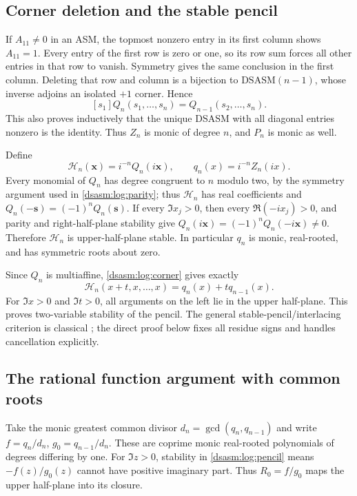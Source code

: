 \documentclass[11pt,letterpaper]{article}
\theoremstyle{remark}\newtheorem{remark}[theorem]{Remark}
\newcommand{\DS}{\mathrm{DSASM}}\newcommand{\ASM}{\mathrm{ASM}}
\begin{document}
\subsection{Corner deletion and the stable pencil}
If $A_{11}\ne0$ in an ASM, the topmost nonzero entry in its first
column shows $A_{11}=1$. Every entry of the first row is zero or one,
so its row sum forces all other entries in that row to vanish.
Symmetry gives the same conclusion in the first column. Deleting
that row and column is a bijection to $\DS(n-1)$, whose inverse
adjoins an isolated $+1$ corner. Hence
\begin{equation}\label{dsasm:log:corner}
 [s_1]Q_n(s_1,\ldots,s_n)=Q_{n-1}(s_2,\ldots,s_n).
\end{equation}
This also proves inductively that the unique DSASM with all diagonal
entries nonzero is the identity. Thus $Z_n$ is monic of degree $n$,
and $P_n$ is monic as well.

Define
\[
 \mathcal H_n(\mathbf x)=i^{-n}Q_n(i\mathbf x),\qquad
 q_n(x)=i^{-n}Z_n(ix).
\]
Every monomial of $Q_n$ has degree congruent to $n$ modulo two, by
the symmetry argument used in \eqref{dsasm:log:parity}; thus $\mathcal H_n$
has real coefficients and $Q_n(-\mathbf s)=(-1)^nQ_n(\mathbf s)$.
If every $\Im x_j>0$, then every $\Re(-ix_j)>0$, and parity and
right-half-plane stability give
$Q_n(i\mathbf x)=(-1)^nQ_n(-i\mathbf x)\ne0$.
Therefore $\mathcal H_n$ is upper-half-plane stable. In particular
$q_n$ is monic, real-rooted, and has symmetric roots about zero.

Since $Q_n$ is multiaffine, \eqref{dsasm:log:corner} gives exactly
\begin{equation}\label{dsasm:log:pencil}
 \mathcal H_n(x+t,x,\ldots,x)=q_n(x)+tq_{n-1}(x).
\end{equation}
For $\Im x>0$ and $\Im t>0$, all arguments on the left lie in the
upper half-plane. This proves two-variable stability of the pencil.
The general stable-pencil/interlacing criterion is classical
\cite[Definition 1.1 and Lemma 1.8]{bb1}; the direct proof below fixes
all residue signs and handles cancellation explicitly.

\subsection{The rational function argument with common roots}
Take the monic greatest common divisor $d_n=\gcd(q_n,q_{n-1})$ and
write $f=q_n/d_n$, $g_0=q_{n-1}/d_n$. These are coprime monic
real-rooted polynomials of degrees differing by one. For $\Im z>0$,
stability in \eqref{dsasm:log:pencil} means $-f(z)/g_0(z)$ cannot have positive
imaginary part. Thus $R_0=f/g_0$ maps the upper half-plane into its
closure.
\end{document}
